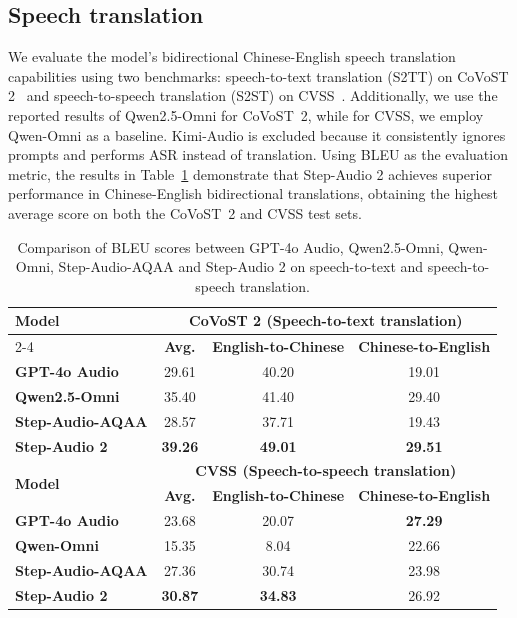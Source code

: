 \subsection{Speech translation}
We evaluate the model's bidirectional Chinese-English speech translation capabilities using two benchmarks: speech-to-text translation (S2TT) on CoVoST 2~\cite{wang2020covost2massivelymultilingual} and speech-to-speech translation (S2ST) on CVSS~\cite{jia2022cvsscorpusmassivelymultilingual}.
Additionally, we use the reported results of Qwen2.5-Omni for CoVoST~2, while for CVSS, we employ Qwen-Omni as a baseline.
Kimi-Audio is excluded because it consistently ignores prompts and performs ASR instead of translation. Using BLEU as the evaluation metric, the results in Table~\ref{tab:S2ST} demonstrate that Step-Audio 2 achieves superior performance in Chinese-English bidirectional translations, obtaining the highest average score on both the CoVoST~2 and CVSS test sets.


\begin{table}[htb]
\caption{Comparison of BLEU scores between GPT-4o Audio, Qwen2.5-Omni, Qwen-Omni, Step-Audio-AQAA and Step-Audio 2 on speech-to-text and speech-to-speech translation.}
\label{tab:S2ST}
\centering
\begin{tabular}{lccc}
\toprule
\multirow{2}{*}{\textbf{Model}}&\multicolumn{3}{c}{\textbf{CoVoST 2 (Speech-to-text translation)}}\\
\cmidrule(lr){2-4}
& \textbf{Avg.} & \textbf{English-to-Chinese}& \textbf{Chinese-to-English}\\
\midrule
\textbf{GPT-4o Audio}       &29.61& 40.20 & 19.01 \\
\textbf{Qwen2.5-Omni}       &35.40& 41.40 & 29.40 \\
\textbf{Step-Audio-AQAA}    &28.57& 37.71 & 19.43 \\
\textbf{Step-Audio 2}       &\textbf{39.26}& \textbf{49.01} & \textbf{29.51} \\
\midrule
\multirow{2}{*}{\textbf{Model}}&\multicolumn{3}{c}{\textbf{CVSS (Speech-to-speech translation)}}\\
\cmidrule(lr){2-4}
&\textbf{Avg.} & \textbf{English-to-Chinese} & \textbf{Chinese-to-English} \\
\midrule
\textbf{GPT-4o Audio}       &23.68& 20.07 & \textbf{27.29} \\
\textbf{Qwen-Omni}          &15.35& 8.04  & 22.66 \\
\textbf{Step-Audio-AQAA}    &27.36& 30.74 & 23.98 \\
\textbf{Step-Audio 2}       &\textbf{30.87}& \textbf{34.83} & 26.92\\
\bottomrule
\end{tabular}
\end{table}


